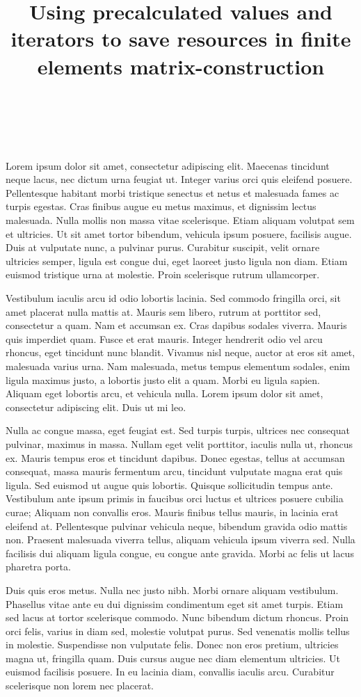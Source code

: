 \documentclass{pssbmac}
\title{Using precalculated values and iterators to save resources in finite elements matrix-construction}
\author{
    \templauthoremail{Daniel K. Hashimoto V. de Andrade}{dkhashimoto@ic.ufrj.br} \\
    \templlocation{UFRJ, Rio de Janeiro, RJ} \\
}
\begin{document}
\maketitle

Lorem ipsum dolor sit amet, consectetur adipiscing elit. Maecenas tincidunt neque lacus, nec dictum urna feugiat ut. Integer varius orci quis eleifend posuere. Pellentesque habitant morbi tristique senectus et netus et malesuada fames ac turpis egestas. Cras finibus augue eu metus maximus, et dignissim lectus malesuada. Nulla mollis non massa vitae scelerisque. Etiam aliquam volutpat sem et ultricies. Ut sit amet tortor bibendum, vehicula ipsum posuere, facilisis augue. Duis at vulputate nunc, a pulvinar purus. Curabitur suscipit, velit ornare ultricies semper, ligula est congue dui, eget laoreet justo ligula non diam. Etiam euismod tristique urna at molestie. Proin scelerisque rutrum ullamcorper.

Vestibulum iaculis arcu id odio lobortis lacinia. Sed commodo fringilla orci, sit amet placerat nulla mattis at. Mauris sem libero, rutrum at porttitor sed, consectetur a quam. Nam et accumsan ex. Cras dapibus sodales viverra. Mauris quis imperdiet quam. Fusce et erat mauris. Integer hendrerit odio vel arcu rhoncus, eget tincidunt nunc blandit. Vivamus nisl neque, auctor at eros sit amet, malesuada varius urna. Nam malesuada, metus tempus elementum sodales, enim ligula maximus justo, a lobortis justo elit a quam. Morbi eu ligula sapien. Aliquam eget lobortis arcu, et vehicula nulla. Lorem ipsum dolor sit amet, consectetur adipiscing elit. Duis ut mi leo.

Nulla ac congue massa, eget feugiat est. Sed turpis turpis, ultrices nec consequat pulvinar, maximus in massa. Nullam eget velit porttitor, iaculis nulla ut, rhoncus ex. Mauris tempus eros et tincidunt dapibus. Donec egestas, tellus at accumsan consequat, massa mauris fermentum arcu, tincidunt vulputate magna erat quis ligula. Sed euismod ut augue quis lobortis. Quisque sollicitudin tempus ante. Vestibulum ante ipsum primis in faucibus orci luctus et ultrices posuere cubilia curae; Aliquam non convallis eros. Mauris finibus tellus mauris, in lacinia erat eleifend at. Pellentesque pulvinar vehicula neque, bibendum gravida odio mattis non. Praesent malesuada viverra tellus, aliquam vehicula ipsum viverra sed. Nulla facilisis dui aliquam ligula congue, eu congue ante gravida. Morbi ac felis ut lacus pharetra porta.

Duis quis eros metus. Nulla nec justo nibh. Morbi ornare aliquam vestibulum. Phasellus vitae ante eu dui dignissim condimentum eget sit amet turpis. Etiam sed lacus at tortor scelerisque commodo. Nunc bibendum dictum rhoncus. Proin orci felis, varius in diam sed, molestie volutpat purus. Sed venenatis mollis tellus in molestie. Suspendisse non vulputate felis. Donec non eros pretium, ultricies magna ut, fringilla quam. Duis cursus augue nec diam elementum ultricies. Ut euismod facilisis posuere. In eu lacinia diam, convallis iaculis arcu. Curabitur scelerisque non lorem nec placerat.
\end{document}
